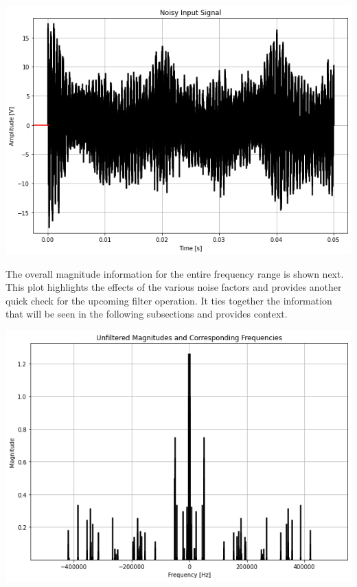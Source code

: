 \documentclass[12pt]{report}
\begin{document}
\begin{center}
	\includegraphics[scale = 0.59]{Lab 12 - Plots/Noisy Input Signal.png}\\[1.0 cm]
\end{center}

The overall magnitude information for the entire frequency range is shown next. This plot highlights the effects of the various noise factors and provides another quick check for the upcoming filter operation. It ties together the information that will be seen in the following subsections and provides context. \\ 

\begin{center}
	\includegraphics[scale = 0.65]{Lab 12 - Plots/Unfiltered FFT1.png}\\[1.0 cm]
\end{center}
\end{document}
